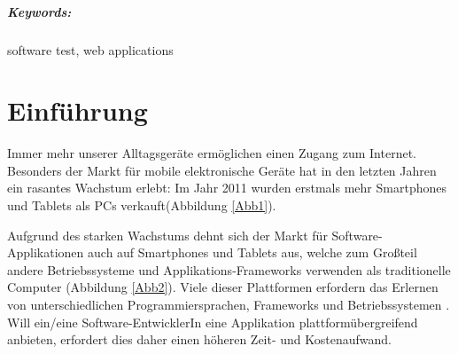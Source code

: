 \documentclass[a4paper,bibtotoc,oneside]{scrbook}
\begin{document}
\vfill
\paragraph*{Keywords:} software test, web applications
\newpage


\tableofcontents\thispagestyle{empty}
\newpage

\setcounter{page}{1}

\chapter{Einführung}
Immer mehr unserer Alltagsgeräte ermöglichen einen Zugang zum Internet. Besonders der Markt für mobile elektronische Geräte hat in den letzten Jahren ein rasantes Wachstum erlebt: Im Jahr 2011 wurden erstmals mehr Smartphones und Tablets  als PCs verkauft(Abbildung \ref{Abb1}).

Aufgrund des starken Wachstums dehnt sich der Markt für Software-Applikationen auch auf Smartphones und Tablets aus, welche zum Großteil andere Betriebssysteme und Applikations-Frameworks verwenden als traditionelle Computer (Abbildung \ref{Abb2}). Viele dieser Plattformen erfordern das Erlernen von unterschiedlichen Programmiersprachen, Frameworks und Betriebssystemen \cite{android}\cite{ios}. Will ein/eine Software-EntwicklerIn eine Applikation plattformübergreifend anbieten, erfordert dies daher einen höheren Zeit- und Kostenaufwand.
\end{document}
